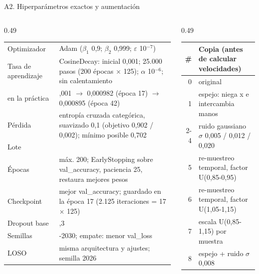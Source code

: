 \documentclass[aspectratio=169,10pt,xcolor={table}]{beamer}
\begin{document}
\begin{frame}{A2. Hiperparámetros exactos y aumentación}\label{fr:hiper}
\begin{columns}[T]
\begin{column}{0.49\textwidth}
\scriptsize{}
\renewcommand{\arraystretch}{1.1}
\begin{tabular}{@{}l >{\raggedright\arraybackslash}p{4.3cm}@{}}
\toprule
Optimizador & Adam ($\beta_1$ 0,9; $\beta_2$ 0,999; $\varepsilon$ 10$^{-7}$) \\
Tasa de aprendizaje & CosineDecay: inicial 0,001; 25.000 pasos (200 épocas $\times$ 125); $\alpha$ 10$^{-6}$; sin calentamiento \\
\quad en la práctica & 0,001 $\rightarrow$ 0,000982 (época 17) $\rightarrow$ 0,000895 (época 42) \\
Pérdida & entropía cruzada categórica, suavizado 0,1 (objetivo 0,902 / 0,002); mínimo posible 0,702 \\
Lote & 64 \\
Épocas & máx. 200; EarlyStopping sobre val\_accuracy, paciencia 25, restaura mejores pesos \\
Checkpoint & mejor val\_accuracy; guardado en la época 17 (2.125 iteraciones = 17 $\times$ 125) \\
Dropout base & 0,3 \\
Semillas & 2026-2030; empate: menor val\_loss \\
LOSO & misma arquitectura y ajustes; semilla 2026 \\
\bottomrule
\end{tabular}
\end{column}
\begin{column}{0.49\textwidth}
\scriptsize{}\raggedright
\renewcommand{\arraystretch}{1.1}
\begin{tabular}{@{}r l@{}}
\toprule
\# & Copia (antes de calcular velocidades) \\
\midrule
0 & original \\
1 & espejo: niega x e intercambia manos \\
2-4 & ruido gaussiano $\sigma$ 0,005 / 0,012 / 0,020 \\
5 & re-muestreo temporal, factor U(0,85-0,95) \\
6 & re-muestreo temporal, factor U(1,05-1,15) \\
7 & escala U(0,85-1,15) por muestra \\
8 & espejo + ruido $\sigma$ 0,008 \\

\end{tabular}
\end{column}
\end{columns}
\end{frame}
\end{document}
